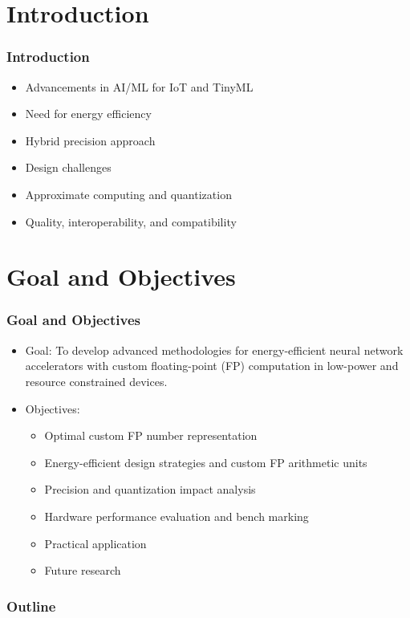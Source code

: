 \section*{Introduction}
	\begin{frame}
		\frametitle{Introduction}
		\begin{itemize}
			\item<1-> Advancements in AI/ML for IoT and TinyML
			\item<2-> Need for energy efficiency
			\item<3-> Hybrid precision approach
			\item<4-> Design challenges
			\item<5-> Approximate computing and quantization
			\item<6-> Quality, interoperability, and compatibility
		\end{itemize}
	\end{frame}
	
	\section*{Goal and Objectives}
	\begin{frame}
		\frametitle{Goal and Objectives}
		\begin{itemize}
			\item<1-> Goal:
			To develop advanced methodologies for energy-efficient neural network accelerators with custom floating-point (FP) computation in low-power and resource constrained devices.
			\item<2-> Objectives:
			\begin{itemize}
				\item<3-> Optimal custom FP number representation
				\item<4-> Energy-efficient design strategies and custom FP arithmetic units
				\item<5-> Precision and quantization impact analysis
				\item<6-> Hardware performance evaluation and bench marking
				\item<7-> Practical application
				\item<8-> Future research
			\end{itemize}
		\end{itemize}
	\end{frame}

	\begin{frame}
	\frametitle{Outline}
	\tableofcontents %
	\end{frame}